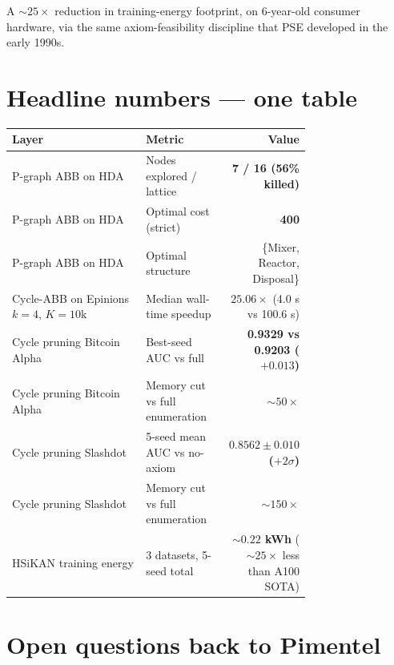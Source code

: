 \documentclass[11pt,a4paper]{article}
\begin{document}
A $\sim 25\times$ reduction in training-energy footprint, on 6-year-old
consumer hardware, via the same axiom-feasibility discipline that
PSE developed in the early 1990s.

\section{Headline numbers --- one table}

\begin{center}\small
\begin{tabular}{p{0.46\linewidth} p{0.28\linewidth} r}
\toprule
Layer                                   & Metric                              & Value \\
\midrule
P-graph ABB on HDA                       & Nodes explored / lattice            & \textbf{7 / 16 (56\% killed)} \\
P-graph ABB on HDA                       & Optimal cost (strict)               & \textbf{400} \\
P-graph ABB on HDA                       & Optimal structure                   & \{Mixer, Reactor, Disposal\} \\
Cycle-ABB on Epinions $k{=}4$, $K{=}10$k & Median wall-time speedup           & \textbf{$25.06\times$} (4.0 s vs 100.6 s) \\
Cycle pruning Bitcoin Alpha              & Best-seed AUC vs full               & \textbf{0.9329 vs 0.9203 ($+0.013$)} \\
Cycle pruning Bitcoin Alpha              & Memory cut vs full enumeration      & $\sim 50\times$ \\
Cycle pruning Slashdot                   & 5-seed mean AUC vs no-axiom        & \textbf{$0.8562 \pm 0.010$ ($+2\sigma$)} \\
Cycle pruning Slashdot                   & Memory cut vs full enumeration      & $\sim 150\times$ \\
HSiKAN training energy                   & 3 datasets, 5-seed total           & \textbf{$\sim 0.22$ kWh} ($\sim 25\times$ less than A100 SOTA) \\
\bottomrule
\end{tabular}
\end{center}

\section{Open questions back to Pimentel}
\end{document}
